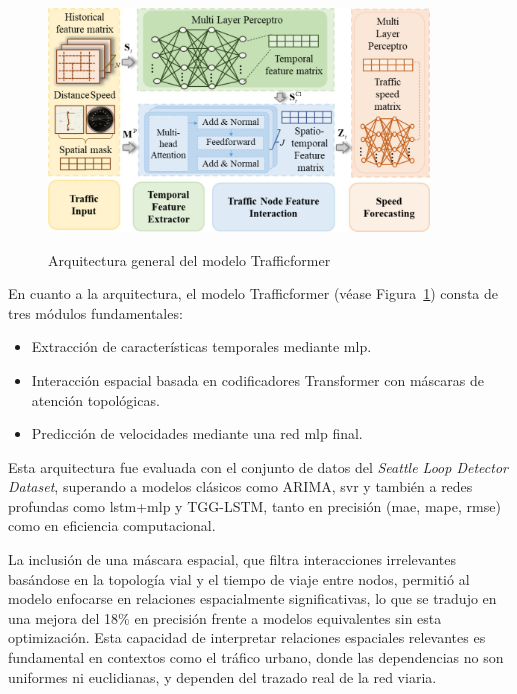 \begin{figure}[H]
	\centering
	\caption{Arquitectura general del modelo Trafficformer \cite{trafficformer}}
	\includegraphics[width=0.9\textwidth]{includes/fnbot-19-1527908-g001.jpg}
	\label{fig:trafficformer}
\end{figure}

En cuanto a la arquitectura, el modelo Trafficformer (véase Figura~\ref{fig:trafficformer}) consta de tres módulos fundamentales:
\begin{itemize}
	\item[(1)] Extracción de características temporales mediante \acrlong{mlp}. 
	\item[(2)] Interacción espacial basada en codificadores Transformer con máscaras de atención topológicas. 
	\item[(3)] Predicción de velocidades mediante una red \acrshort{mlp} final. 
\end{itemize}

Esta arquitectura fue evaluada con el conjunto de datos del \textit{Seattle Loop Detector Dataset}, superando a modelos clásicos como ARIMA, \acrshort{svr} y también a redes profundas como \acrshort{lstm}+\acrshort{mlp} y TGG-LSTM, tanto en precisión (\acrshort{mae}, \acrshort{mape}, \acrshort{rmse}) como en eficiencia computacional.

La inclusión de una máscara espacial, que filtra interacciones irrelevantes basándose en la topología vial y el tiempo de viaje entre nodos, permitió al modelo enfocarse en relaciones espacialmente significativas, lo que se tradujo en una mejora del 18\% en precisión frente a modelos equivalentes sin esta optimización. Esta capacidad de interpretar relaciones espaciales relevantes es fundamental en contextos como el tráfico urbano, donde las dependencias no son uniformes ni euclidianas, y dependen del trazado real de la red viaria.

